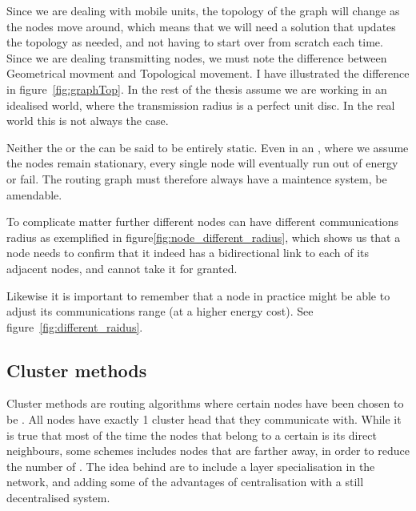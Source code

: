 \documentclass[letter, 12pt, english, draft]{article}
\begin{document}
Since we are dealing with mobile units, the topology of the graph will change as the nodes move around, which means that we will need a solution that updates the topology as needed, and not having to start over from scratch each time. Since we are dealing transmitting nodes, we must note the difference between Geometrical movment and Topological movement. I have illustrated the difference in figure~\ref{fig:graphTop}. In the rest of the thesis assume we are working in an idealised world, where the transmission radius is a perfect unit disc. In the real world this is not always the case.

Neither the \manet or the \anet can be said to be entirely static. Even in an \anet, where we assume the nodes remain stationary, every single node will eventually run out of energy or fail. The routing graph must therefore always have a maintence system, be amendable. 


To complicate matter further different nodes can have different communications radius as exemplified in figure\ref{fig:node_different_radius}, which shows us that a node needs to confirm that it indeed has a bidirectional link to each of its adjacent nodes, and cannot take it for granted.


Likewise it is important to remember that a node in practice might be able to adjust its communications range (at a higher energy cost). See figure~\ref{fig:different_raidus}.

\subsection{Cluster methods}
\label{cluster methods}
Cluster methods are routing algorithms where certain nodes have been chosen to be \ch. All nodes have exactly 1 cluster head that they communicate with. While it is true that most of the time the nodes that belong to a certain \ch is its direct neighbours, some schemes includes nodes that are farther away, in order to reduce the number of \ch. The idea behind \ch are to include a layer specialisation in the network, and adding some of the advantages of centralisation with a still decentralised system. 
\end{document}
